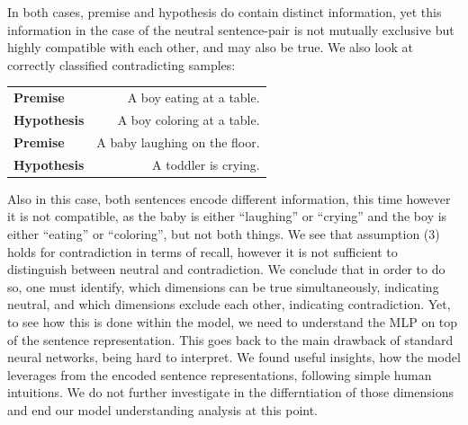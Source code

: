 In both cases, premise and hypothesis do contain distinct information, yet this information in the case of the neutral sentence-pair is not mutually exclusive but highly compatible with each other, and may also be true. We also look at correctly classified contradicting samples:
\begin{center}
\begin{tabular}{lr}
\textbf{Premise} & A boy eating at a table. \\
\textbf{Hypothesis} & A boy coloring at a table. \\
\midrule
\textbf{Premise} & A baby laughing on the floor. \\
\textbf{Hypothesis} & A toddler is crying.
\end{tabular}
\end{center}
Also in this case, both sentences encode different information, this time however it is not compatible, as the baby is either ``laughing'' or ``crying'' and the boy is either ``eating'' or ``coloring'', but not both things. We see that assumption (3) holds for contradiction in terms of recall, however it is not sufficient to distinguish between neutral and contradiction. We conclude that in order to do so, one must identify, which dimensions can be true simultaneously, indicating neutral, and which dimensions exclude each other, indicating contradiction. Yet, to see how this is done within the model, we need to understand the \ac{MLP} on top of the sentence representation. This goes back to the main drawback of standard neural networks, being hard to interpret. We found useful insights, how the model leverages from the encoded sentence representations, following simple human intuitions. We do not further investigate in the differntiation of those dimensions and end our model understanding analysis at this point.

